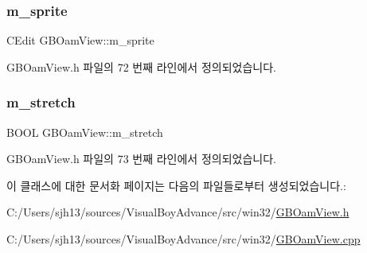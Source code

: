 \subsubsection{\texorpdfstring{m\+\_\+sprite}{m\_sprite}}
{\footnotesize\ttfamily C\+Edit G\+B\+Oam\+View\+::m\+\_\+sprite}



G\+B\+Oam\+View.\+h 파일의 72 번째 라인에서 정의되었습니다.

\mbox{\label{class_g_b_oam_view_a3148ea0439a7fc0679298adbdb5d2a3e}} 
\subsubsection{\texorpdfstring{m\+\_\+stretch}{m\_stretch}}
{\footnotesize\ttfamily B\+O\+OL G\+B\+Oam\+View\+::m\+\_\+stretch}



G\+B\+Oam\+View.\+h 파일의 73 번째 라인에서 정의되었습니다.



이 클래스에 대한 문서화 페이지는 다음의 파일들로부터 생성되었습니다.\+:\begin{DoxyCompactItemize}
\item 
C\+:/\+Users/sjh13/sources/\+Visual\+Boy\+Advance/src/win32/\mbox{\hyperlink{_g_b_oam_view_8h}{G\+B\+Oam\+View.\+h}}\item 
C\+:/\+Users/sjh13/sources/\+Visual\+Boy\+Advance/src/win32/\mbox{\hyperlink{_g_b_oam_view_8cpp}{G\+B\+Oam\+View.\+cpp}}\end{DoxyCompactItemize}
